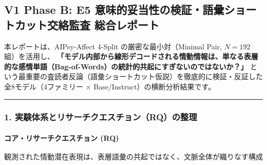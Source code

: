 \subsection{V1 Phase B: E5 意味的妥当性の検証・語彙ショートカット交絡監査 総合レポート}

本レポートは、AIPsy-Affect 4-Split の厳密な最小対（Minimal Pair, $N=192$ 組）を活用し、
\textbf{「モデル内部から線形デコードされる情動情報は、単なる表層的な感情単語（Bag-of-Words）の統計的共起にすぎないのではないか？」}
という最重要の査読者反論（語彙ショートカット仮説）を徹底的に検証・反証した全8モデル（4ファミリー × Base/Instruct）の横断分析結果です。

\vspace{0.5em}\hrule\vspace{0.5em}

\subsubsection{1. 実験体系とリサーチクエスチョン（RQ）の整理}

\paragraph{コア・リサーチクエスチョン (RQ)}
\[\boxed{\text{観測された情動潜在表現は、表層語彙の共起ではなく、文脈全体が織りなす構成的感情意味（Compositional Meaning）に基づいているか？}}\]

